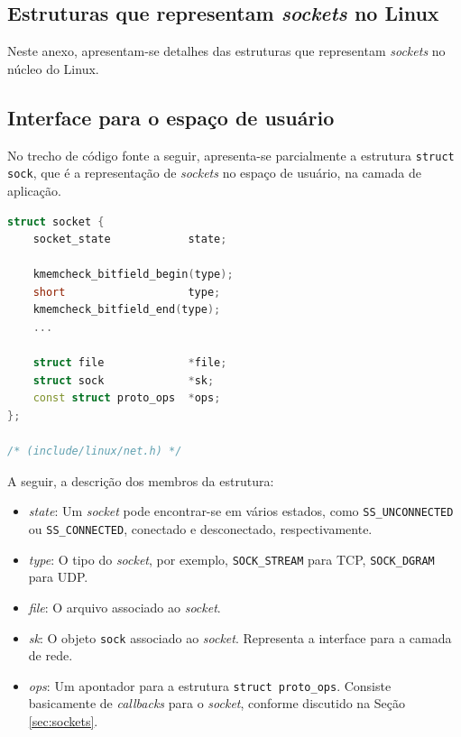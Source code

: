\begin{anexosenv}

\partanexos

\chapter{Estruturas que representam \textit{sockets} no Linux}
\label{anex:struct_sk}

Neste anexo, apresentam-se detalhes das estruturas que representam \textit{sockets} no núcleo do Linux.

\section{Interface para o espaço de usuário}
\label{anex:socket}

No trecho de código fonte a seguir, apresenta-se parcialmente a estrutura \lstinline|struct sock|, que é a representação de \textit{sockets} no espaço de usuário, na camada de aplicação.

\begin{lstlisting}[language=C++, caption={Estrutura que representa um \textit{socket} no espaço de usuário do Linux}, label={list:socket}]
struct socket {
	socket_state			state;

	kmemcheck_bitfield_begin(type);
	short					type;
	kmemcheck_bitfield_end(type);
	...

	struct file				*file;
	struct sock				*sk;
	const struct proto_ops	*ops;
};
 
/* (include/linux/net.h) */
\end{lstlisting}

A seguir, a descrição dos membros da estrutura:
\begin{itemize}
\item \textit{state}: Um \textit{socket} pode encontrar-se em vários estados, como  \lstinline|SS_UNCONNECTED| ou \lstinline|SS_CONNECTED|, conectado e desconectado, respectivamente.
\item \textit{type}: O tipo do \textit{socket}, por exemplo, \lstinline|SOCK_STREAM| para TCP, \lstinline|SOCK_DGRAM| para UDP.
\item \textit{file}: O arquivo associado ao \textit{socket}.
\item \textit{sk}: O objeto \lstinline|sock| associado ao \textit{socket}. Representa a interface para a camada de rede.
\item \textit{ops}: Um apontador para a estrutura \lstinline|struct proto_ops|. Consiste basicamente de \textit{callbacks} para o \textit{socket}, conforme discutido na Seção \ref{sec:sockets}.
\end{itemize}


\end{anexosenv}

